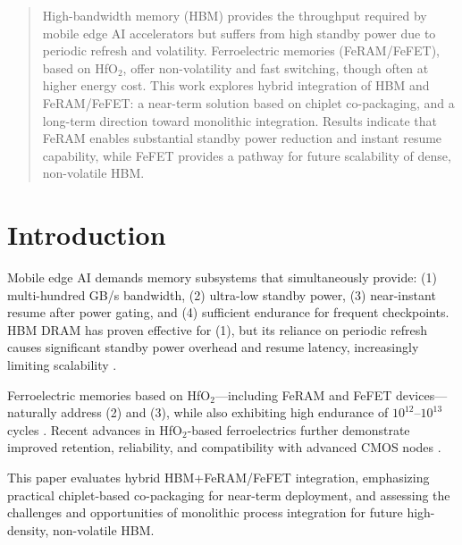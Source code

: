 \begin{abstract}
High-bandwidth memory (HBM) provides the throughput required by mobile edge AI accelerators but suffers from high standby power due to periodic refresh and volatility. 
Ferroelectric memories (FeRAM/FeFET), based on HfO$_2$, offer non-volatility and fast switching, though often at higher energy cost. 
This work explores hybrid integration of HBM and FeRAM/FeFET: a near-term solution based on chiplet co-packaging, and a long-term direction toward monolithic integration. 
Results indicate that FeRAM enables substantial standby power reduction and instant resume capability, while FeFET provides a pathway for future scalability of dense, non-volatile HBM.
\end{abstract}

\section{Introduction}
Mobile edge AI demands memory subsystems that simultaneously provide:
(1) multi-hundred GB/s bandwidth, 
(2) ultra-low standby power, 
(3) near-instant resume after power gating, 
and (4) sufficient endurance for frequent checkpoints.
HBM DRAM has proven effective for (1), but its reliance on periodic refresh causes significant standby power overhead and resume latency, increasingly limiting scalability \cite{ChoiIEDM2022,KimIEDM2021}.  

Ferroelectric memories based on HfO$_2$---including FeRAM and FeFET devices---naturally address (2) and (3), while also exhibiting high endurance of $10^{12}$–$10^{13}$ cycles \cite{MuellerIEDM2012,MartinVLSI2020}. 
Recent advances in HfO$_2$-based ferroelectrics further demonstrate improved retention, reliability, and compatibility with advanced CMOS nodes \cite{NohedaNature2023}.  

This paper evaluates hybrid HBM+FeRAM/FeFET integration, emphasizing practical chiplet-based co-packaging for near-term deployment, and assessing the challenges and opportunities of monolithic process integration for future high-density, non-volatile HBM.
